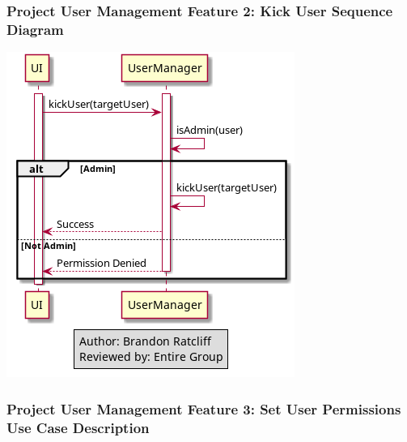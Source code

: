 \documentclass[twoside,letterpaper]{article}
\begin{document}
\subsubsection[Project User Management Feature 2: Kick User Sequence Diagram]{\rmfamily\bfseries\color{black}
	Project User Management Feature 2: Kick User Sequence Diagram}
\hypertarget{RefHeading22059017292}{}
\includegraphics[width=\textwidth]{images/SequenceDiagrams/ProjectUserManagementKickUser}
\newpage

\subsubsection[Project User Management Feature 3: Set User Permissions Use Case Description ]{\rmfamily\bfseries\color{black}
	Project User Management Feature 3: Set User Permissions Use Case Description}
\hypertarget{RefHeading22059017292}{}
\end{document}
